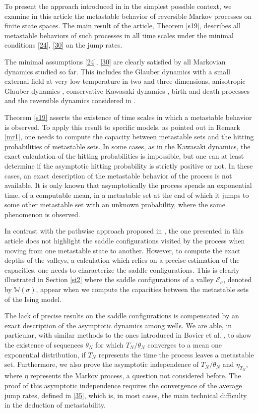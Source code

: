 \documentclass[reqno]{amsart}
\begin{document}
To present the approach introduced in \cite{bl2} in the simplest
possible context, we examine in this article the metastable behavior
of reversible Markov processes on finite state spaces. The main result
of the article, Theorem \ref{s19}, describes all metastable behaviors
of such processes in all time scales under the minimal conditions
\eqref{24}, \eqref{30} on the jump rates.

The minimal assumptions \eqref{24}, \eqref{30} are clearly satisfied
by all Markovian dynamics studied so far. This includes the Glauber
dynamics with a small external field at very low temperature in two
\cite{ns1, ns2} and three \cite{bc} dimensions, anisotropic Glauber
dynamics \cite{ko1, ko2}, conservative Kawasaki dynamics \cite{hnos1,
  hnos2, hnos, ghnos1}, birth and death processes \cite{s} and the
reversible dynamics considered in \cite{bm}.

Theorem \ref{s19} asserts the existence of time scales in which a
metastable behavior is observed. To apply this result to specific
models, as pointed out in Remark \ref{mr1}, one needs to compute the
capacity between metastable sets and the hitting probabilities of
metastable sets. In some cases, as in the Kawasaki dynamics, the exact
calculation of the hitting probabilities is impossible, but one can at
least determine if the asymptotic hitting probability is strictly
positive or not. In these cases, an exact description of the
metastable behavior of the process is not available. It is only known
that asymptotically the process spends an exponential time, of a
computable mean, in a metastable set at the end of which it jumps to
some other metastable set with an unknown probability, where the same
phenomenon is observed.

In contrast with the pathwise approach proposed in \cite{cgov}, the
one presented in this article does not highlight the saddle
configurations visited by the process when moving from one metastable
state to another. However, to compute the exact depths of the valleys,
a calculation which relies on a precise estimation of the capacities,
one needs to characterize the saddle configurations. This is clearly
illustrated in Section \ref{si2} where the saddle configurations of a
valley ${{\mathcal E}}_\sigma$, denoted by ${{\mathbb W}}(\sigma)$, appear when we
compute the capacities between the metastable sets of the Ising model.

The lack of precise results on the saddle configurations is
compensated by an exact description of the asymptotic dynamics among
wells. We are able, in particular, with similar methods to the ones
introduced in Bovier et al. \cite{begk1, begk2}, to show the existence
of sequences $\theta_N$ for which $T_N/\theta_N$ converges to a mean
one exponential distribution, if $T_N$ represents the time the process
leaves a metastable set. Furthermore, we also prove the asymptotic
independence of $T_N/\theta_N$ and $\eta_{T_N}$, where $\eta$
represents the Markov process, a question not considered before. The
proof of this asymptotic independence requires the convergence of the
average jump rates, defined in \eqref{35}, which is, in most cases,
the main technical difficulty in the deduction of metastability.
\end{document}
